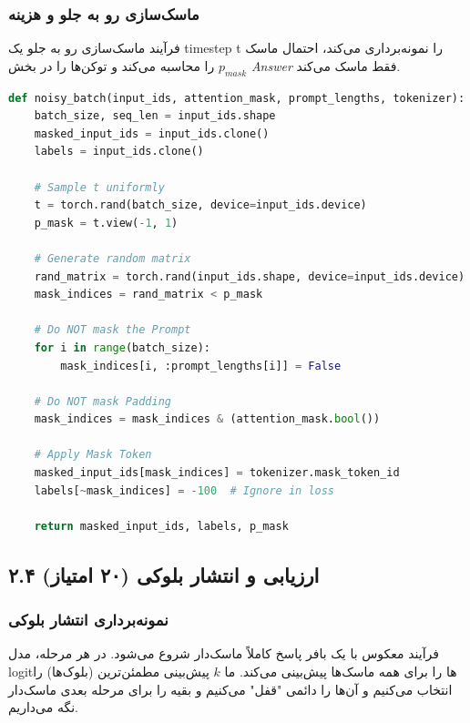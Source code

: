 \documentclass[12pt,a4paper]{article}
\theoremstyle{definition}
\begin{document}
\subsubsection*{ماسک‌سازی رو به جلو و هزینه}
فرآیند ماسک‌سازی رو به جلو یک timestep t را نمونه‌برداری می‌کند، احتمال ماسک $p_{mask}$ را محاسبه می‌کند و توکن‌ها را در بخش \textit{Answer} فقط ماسک می‌کند.

\begin{lstlisting}[language=Python, caption=قطعه کد منطق ماسک‌سازی]
def noisy_batch(input_ids, attention_mask, prompt_lengths, tokenizer):
    batch_size, seq_len = input_ids.shape
    masked_input_ids = input_ids.clone()
    labels = input_ids.clone()
    
    # Sample t uniformly
    t = torch.rand(batch_size, device=input_ids.device)
    p_mask = t.view(-1, 1) 
    
    # Generate random matrix
    rand_matrix = torch.rand(input_ids.shape, device=input_ids.device)
    mask_indices = rand_matrix < p_mask
    
    # Do NOT mask the Prompt
    for i in range(batch_size):
        mask_indices[i, :prompt_lengths[i]] = False
        
    # Do NOT mask Padding
    mask_indices = mask_indices & (attention_mask.bool())

    # Apply Mask Token
    masked_input_ids[mask_indices] = tokenizer.mask_token_id
    labels[~mask_indices] = -100  # Ignore in loss
    
    return masked_input_ids, labels, p_mask
\end{lstlisting}

\subsection{۲.۴ ارزیابی و انتشار بلوکی (۲۰ امتیاز)}

\subsubsection*{نمونه‌برداری انتشار بلوکی}
فرآیند معکوس با یک بافر پاسخ کاملاً ماسک‌دار شروع می‌شود. در هر مرحله، مدل logitها را برای همه ماسک‌ها پیش‌بینی می‌کند. ما $k$ پیش‌بینی مطمئن‌ترین (بلوک‌ها) را انتخاب می‌کنیم و آن‌ها را دائمی "قفل" می‌کنیم و بقیه را برای مرحله بعدی ماسک‌دار نگه می‌داریم.
\end{document}
